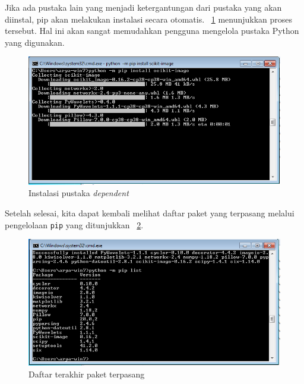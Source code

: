 Jika ada pustaka lain yang menjadi ketergantungan dari pustaka yang akan diinstal, pip akan melakukan instalasi secara otomatis. \figurename~\ref{fig:installDepend} menunjukkan proses tersebut. Hal ini akan sangat memudahkan pengguna mengelola pustaka Python yang digunakan.

\begin{figure}[h!]
  \begin{center}
    \includegraphics[scale=.5]{pics/installScikit-Imagedependencies.png}
    \caption{Instalasi pustaka \textit{dependent}}
    \label{fig:installDepend}
  \end{center}
\end{figure}

Setelah selesai, kita dapat kembali melihat daftar paket yang terpasang melalui pengelolaan \texttt{pip} yang ditunjukkan \figurename~\ref{fig:daftarPaket2}.

\begin{figure}[h!]
  \begin{center}
    \includegraphics[scale=.5]{pics/pipList3.png}
    \caption{Daftar terakhir paket terpasang}
    \label{fig:daftarPaket2}
  \end{center}
\end{figure}

